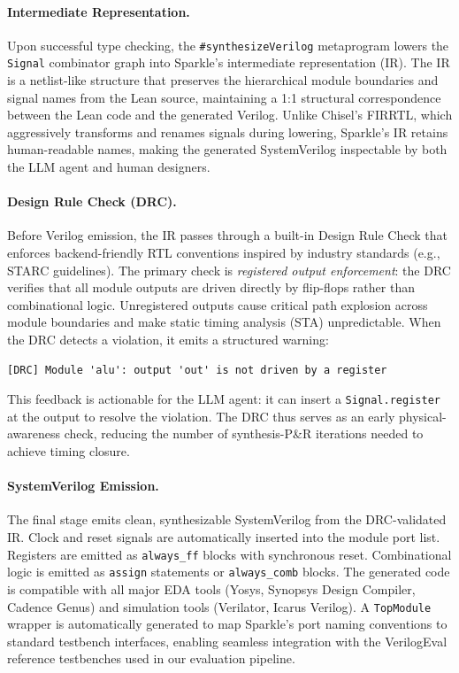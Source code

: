 \paragraph{Intermediate Representation.}
Upon successful type checking, the \texttt{\#synthesizeVerilog} metaprogram lowers the \texttt{Signal} combinator graph into Sparkle's intermediate representation (IR). The IR is a netlist-like structure that preserves the hierarchical module boundaries and signal names from the Lean source, maintaining a 1:1 structural correspondence between the Lean code and the generated Verilog. Unlike Chisel's FIRRTL, which aggressively transforms and renames signals during lowering, Sparkle's IR retains human-readable names, making the generated SystemVerilog inspectable by both the LLM agent and human designers.

\paragraph{Design Rule Check (DRC).}
Before Verilog emission, the IR passes through a built-in Design Rule Check that enforces backend-friendly RTL conventions inspired by industry standards (e.g., STARC guidelines). The primary check is \emph{registered output enforcement}: the DRC verifies that all module outputs are driven directly by flip-flops rather than combinational logic. Unregistered outputs cause critical path explosion across module boundaries and make static timing analysis (STA) unpredictable. When the DRC detects a violation, it emits a structured warning:
\begin{small}
\begin{verbatim}
[DRC] Module 'alu': output 'out' is not driven by a register
\end{verbatim}
\end{small}
This feedback is actionable for the LLM agent: it can insert a \texttt{Signal.register} at the output to resolve the violation. The DRC thus serves as an early physical-awareness check, reducing the number of synthesis-P\&R iterations needed to achieve timing closure.

\paragraph{SystemVerilog Emission.}
The final stage emits clean, synthesizable SystemVerilog from the DRC-validated IR. Clock and reset signals are automatically inserted into the module port list. Registers are emitted as \texttt{always\_ff} blocks with synchronous reset. Combinational logic is emitted as \texttt{assign} statements or \texttt{always\_comb} blocks. The generated code is compatible with all major EDA tools (Yosys, Synopsys Design Compiler, Cadence Genus) and simulation tools (Verilator, Icarus Verilog). A \texttt{TopModule} wrapper is automatically generated to map Sparkle's port naming conventions to standard testbench interfaces, enabling seamless integration with the VerilogEval reference testbenches used in our evaluation pipeline.

